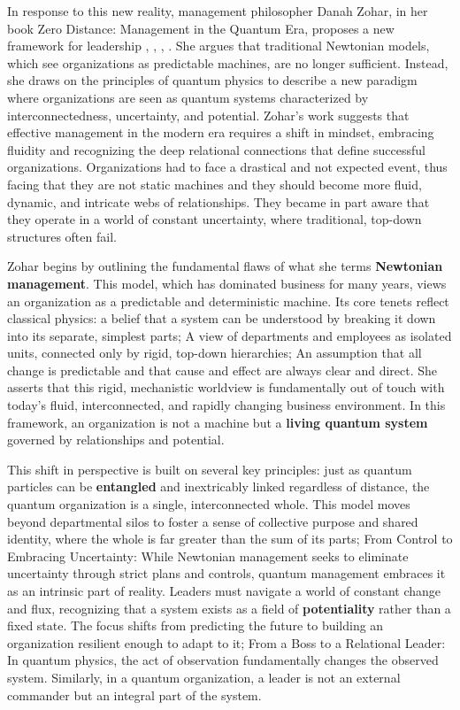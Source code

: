 \documentclass{article}
\begin{document}
In response to this new reality, management philosopher Danah Zohar, in her book Zero Distance: Management in the Quantum Era, proposes a new framework for leadership \cite{zohar2021zerodistance}, \cite{zohar1990quantum}, \cite{zohar2000quantumleader}, \cite{zohar2004spiritual}. She argues that traditional Newtonian models, which see organizations as predictable machines, are no longer sufficient. Instead, she draws on the principles of quantum physics to describe a new paradigm where organizations are seen as quantum systems characterized by interconnectedness, uncertainty, and potential. Zohar's work suggests that effective management in the modern era requires a shift in mindset, embracing fluidity and recognizing the deep relational connections that define successful organizations.
Organizations had to face a drastical and not expected event, thus facing that they are not static machines and they should become more fluid, dynamic, and intricate webs of relationships. They became in part aware that they operate in a world of constant uncertainty, where traditional, top-down structures often fail.

Zohar begins by outlining the fundamental flaws of what she terms \textbf{Newtonian management}. This model, which has dominated business for many years, views an organization as a predictable and deterministic machine. Its core tenets reflect classical physics: a belief that a system can be understood by breaking it down into its separate, simplest parts; A view of departments and employees as isolated units, connected only by rigid, top-down hierarchies; An assumption that all change is predictable and that cause and effect are always clear and direct. She asserts that this rigid, mechanistic worldview is fundamentally out of touch with today's fluid, interconnected, and rapidly changing business environment. In this framework, an organization is not a machine but a \textbf{living quantum system} governed by relationships and potential. 

This shift in perspective is built on several key principles: just as quantum particles can be \textbf{entangled} and inextricably linked regardless of distance, the quantum organization is a single, interconnected whole. This model moves beyond departmental silos to foster a sense of collective purpose and shared identity, where the whole is far greater than the sum of its parts; From Control to Embracing Uncertainty: While Newtonian management seeks to eliminate uncertainty through strict plans and controls, quantum management embraces it as an intrinsic part of reality. Leaders must navigate a world of constant change and flux, recognizing that a system exists as a field of \textbf{potentiality} rather than a fixed state. The focus shifts from predicting the future to building an organization resilient enough to adapt to it; From a Boss to a Relational Leader: In quantum physics, the act of observation fundamentally changes the observed system. Similarly, in a quantum organization, a leader is not an external commander but an integral part of the system. 
\end{document}
